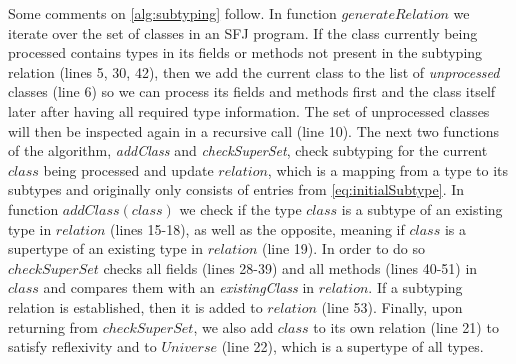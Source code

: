 \documentclass[runningheads]{llncs}
\begin{document}
Some comments on \autoref{alg:subtyping} follow.
In function $generateRelation$ we iterate over the set of classes in an SFJ program.
If the class currently being processed contains types in its fields or methods not present in the subtyping relation (lines 5, 30, 42), then we add the current class to the list of \emph{unprocessed} classes (line 6) so we can process its fields and methods first and the class itself later after having all required type information.
The set of unprocessed classes will then be inspected again in a recursive call (line 10).
The next two functions of the algorithm, \emph{addClass} and \emph{checkSuperSet}, check subtyping for the current $class$ being processed and update $relation$, which is a mapping from a type to its subtypes and originally only consists of entries from \autoref{eq:initialSubtype}.
In function $addClass(class)$ we check if the type $class$ is a subtype of an existing type in $relation$ (lines 15-18), as well as the opposite, meaning if $class$ is a supertype of an existing type in $relation$ (line 19).
In order to do so $checkSuperSet$ checks all fields (lines 28-39) and all methods (lines 40-51) in $class$ and compares them with an \emph{existingClass} in $relation$.
If a subtyping relation is established, then it is added to $relation$ (line 53).
Finally, upon returning from $checkSuperSet$, we also add $class$ to its own relation (line 21) to satisfy reflexivity and to $Universe$ (line 22), which is a supertype of all types.
\end{document}
